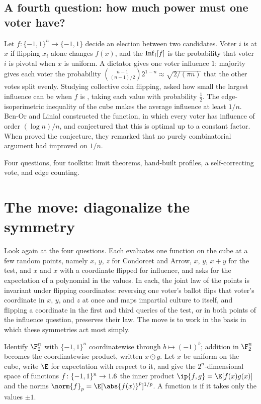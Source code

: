 \begin{refsection}
\subsection{A fourth question: how much power must one voter have?}\label{sec:fourier:power}

Let $f\colon\{-1,1\}^n\to\{-1,1\}$ decide an election between two candidates. Voter $i$ is  at $x$ if flipping $x_i$ alone changes $f(x)$, and the  $\operatorname{Inf}_i[f]$ is the probability that voter $i$ is pivotal when $x$ is uniform. A dictator gives one voter influence $1$; majority gives each voter the probability $\binom{n-1}{(n-1)/2}2^{1-n}\approx\sqrt{2/(\pi n)}$ that the other votes split evenly. Studying collective coin flipping, \textcite{BenOrLinial1985} asked how small the largest influence can be when $f$ is , taking each value with probability $\frac12$. The edge-isoperimetric inequality of the cube makes the average influence at least $1/n$. Ben-Or and Linial constructed the  function, in which every voter has influence of order $(\log n)/n$, and conjectured that this is optimal up to a constant factor. When \textcite{KahnKalaiLinial1988} proved the conjecture, they remarked that no purely combinatorial argument had improved on $1/n$.

Four questions, four toolkits: limit theorems, hand-built profiles, a self-correcting vote, and edge counting.

\section{The move: diagonalize the symmetry}\label{sec:fourier:move}

Look again at the four questions. Each evaluates one function on the cube at a few random points, namely $x$, $y$, $z$ for Condorcet and Arrow, $x$, $y$, $x+y$ for the test, and $x$ and $x$ with a coordinate flipped for influence, and asks for the expectation of a polynomial in the values. In each, the joint law of the points is invariant under flipping coordinates: reversing one voter's ballot flips that voter's coordinate in $x$, $y$, and $z$ at once and maps impartial culture to itself, and flipping a coordinate in the first and third queries of the test, or in both points of the influence question, preserves their law. The move is to work in the basis in which these symmetries act most simply.

Identify $\F_2^n$ with $\{-1,1\}^n$ coordinatewise through $b\mapsto(-1)^b$; addition in $\F_2^n$ becomes the coordinatewise product, written $x\odot y$. Let $x$ be uniform on the cube, write $\E$ for expectation with respect to it, and give the $2^n$-dimensional space of functions $f\colon\{-1,1\}^n\to1.6$ the inner product $\ip{f,g}=\E[f(x)g(x)]$ and the norms $\norm{f}_p=\E[\abs{f(x)}^p]^{1/p}$. A function is  if it takes only the values $\pm1$.


\end{refsection}

